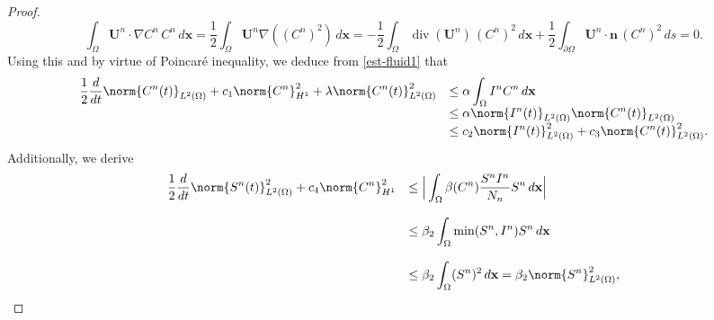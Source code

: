 \documentclass[10pt,number,preprint,times]{elsarticle}
\numberwithin{equation}{section} %
\begin{document}
\begin{proof}
\begin{equation}
\displaystyle \int_\Omega  \boldsymbol{U}^n\cdot\nabla C^n \, C^n \, d\mathbf{x}= \frac{1}{2}\int_\Omega\boldsymbol{U}^n\nabla ((C^n)^2) \, d\mathbf{x}=-\frac{1}{2}\int_\Omega\operatorname{div}(\boldsymbol{U}^n) \, (C^n)^2 \, d\mathbf{x}+\frac{1}{2}\int_{\partial\Omega} \boldsymbol{U}^n\cdot\boldsymbol{n}\,(C^n)^2\,ds=0.
		\end{equation}%
		Using this and by virtue of Poincaré inequality, we deduce from \eqref{est-fluid1} that
		\begin{equation}\label{1} 
			\begin{array}{rl}
				\displaystyle  \frac{1}{2} \frac{d}{dt}\norm{C^n(t)}_{L^2(\Omega)}  + \displaystyle  c_1     \norm{C^n}_{H^{1}}^2  +\lambda    \norm{C^n(t)}_{L^2(\Omega)}^2
				 &\displaystyle  \leq  \alpha  \int_{\Omega} I^nC^n  \, d\mathbf{x} \\
				 &\displaystyle  \leq   
				  \alpha \norm{I^n(t)}_{L^2(\Omega)}\norm{C^n(t)}_{L^2(\Omega)}
				 \\ 
				& \displaystyle  \leq c_2  \norm{I^n(t)}_{L^2(\Omega)}^2 + c_3  \norm{C^n(t)}_{L^2(\Omega)}^2.
			\end{array}
		\end{equation}
		Additionally, we derive
		\begin{equation}\label{2} 
			\begin{array}{rl}	
				\displaystyle	\frac{1}{2} \frac{d}{dt}\norm{S^n(t)}_{L^2(\Omega)}^2 +c_4     \norm{C^n}_{H^{1}}^2 
				&	\leq \displaystyle
				\Big| \int_{\Omega} \beta(C^n) \frac{S^n I^n }{N_n} S^n\, d\mathbf{x} \Big|
				\\\\
				&	\leq \displaystyle\beta_2  \int_{\Omega} \min(S^n,I^n) S^n\, d\mathbf{x}
				\\\\
				&	\leq \displaystyle\beta_2  \int_{\Omega} (S^n)^2\, d\mathbf{x}=\beta_2 \norm{S^n}_{L^2(\Omega)}^2,
			\end{array}
		\end{equation}
		

\end{proof}
\end{document}
